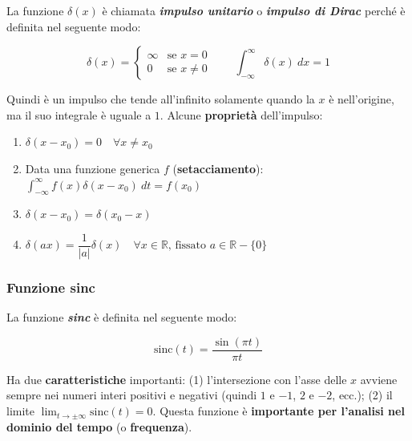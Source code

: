 \documentclass[a4paper]{article}
\begin{document}
	La funzione $\delta(x)$ è chiamata \textbf{\emph{impulso unitario}} o \textbf{\emph{impulso di Dirac}} perché è definita nel seguente modo:
	
	\begin{equation*}
		\delta(x) = 
		\begin{cases}
			\infty  & \text{se } x=0 \\
			0		& \text{se } x\ne 0
		\end{cases}
		\hspace{2em} \int_{-\infty}^{\infty} \delta(x)\: dx = 1
	\end{equation*}

	\noindent
	Quindi è un impulso che tende all'infinito solamente quando la $x$ è nell'origine, ma il suo integrale è uguale a $1$. Alcune \textbf{proprietà} dell'impulso:
	
	\begin{enumerate}
		\item $\delta(x-x_0) = 0 \hspace{1em} \forall x\ne x_0$
		\item Data una funzione generica $f$ (\textbf{setacciamento}): $\displaystyle \int_{-\infty}^{\infty} f(x)\delta(x-x_0)\: dt = f(x_0)$
		\item $\delta(x - x_0) = \delta(x_0 - x)$
		\item $\delta(ax) = \dfrac{1}{|a|} \delta(x) \hspace{1em} \forall x \in \mathbb{R} \text{, fissato } a \in \mathbb{R}-\{0\}$
	\end{enumerate}

	\newpage
	
	\subsubsection{Funzione sinc}
	
	La funzione \textbf{\emph{sinc}} è definita nel seguente modo:
	
	\begin{equation*}
		\mathrm{sinc}(t) = \dfrac{\sin{\left(\pi t\right)}}{\pi t}
	\end{equation*}

	\noindent
	Ha due \textbf{caratteristiche} importanti: (1) l'intersezione con l'asse delle $x$ avviene sempre nei numeri interi positivi e negativi (quindi $1$ e $-1$, $2$ e $-2$, ecc.); (2) il limite $\displaystyle \lim_{t\rightarrow \pm\infty}\mathrm{sinc}(t) = 0$.\newline
	Questa funzione è \textbf{importante per l'analisi nel dominio del tempo} (o \textbf{frequenza}).
	
\end{document}
